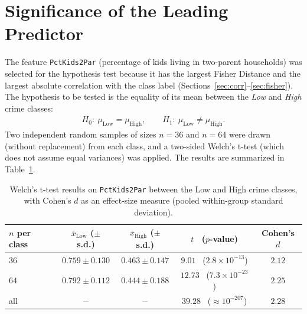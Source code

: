 \documentclass{ieeeaccess}
\begin{document}
\section{Significance of the Leading Predictor}
\label{sec:hypothesis}
The feature \texttt{PctKids2Par} (percentage of kids living in two-parent households) was selected for the hypothesis test because it has the largest Fisher Distance and the largest absolute correlation with the class label (Sections~\ref{sec:corr}--\ref{sec:fisher}). The hypothesis to be tested is the equality of its mean between the \emph{Low} and \emph{High} crime classes:
\begin{align*}
H_0:\ \mu_{\text{Low}} = \mu_{\text{High}}, \qquad
H_1:\ \mu_{\text{Low}} \neq \mu_{\text{High}}.
\end{align*}
Two independent random samples of sizes $n=36$ and $n=64$ were drawn (without replacement) from each class, and a two-sided Welch's t-test \cite{welch} (which does not assume equal variances) was applied. The results are summarized in Table~\ref{tab:ttest}.

\begin{table}[!t]
\caption{Welch's t-test results on \texttt{PctKids2Par} between the Low and High crime classes, with Cohen's $d$ as an effect-size measure (pooled within-group standard deviation).}
\label{tab:ttest}
\centering
\begin{tabular}{lcccc}
\toprule
$n$ per class & $\bar x_{\text{Low}}$ ($\pm$ s.d.) & $\bar x_{\text{High}}$ ($\pm$ s.d.) & $t$ \ ($p$-value) & Cohen's $d$ \\
\midrule
$36$ & $0.759\pm 0.130$ & $0.463\pm 0.147$ & $9.01$ \ ($2.8\!\times\!10^{-13}$) & $2.12$ \\
$64$ & $0.792\pm 0.112$ & $0.444\pm 0.188$ & $12.73$ \ ($7.3\!\times\!10^{-23}$) & $2.25$ \\
all  & $-$              & $-$              & $39.28$ \ ($\approx 10^{-207}$)    & $2.28$ \\
\bottomrule
\end{tabular}
\end{table}
\end{document}
